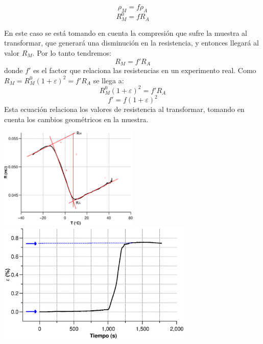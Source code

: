 \documentclass[usenames,dvipsnames]{beamer}
\begin{document}

\begin{frame}
\begin{equation*}
  \rho_M =f \rho_A
\end{equation*}
\begin{equation*}
 R_M^0 =fR_A   
\end{equation*}

En este caso se está tomando en cuenta la compresión que sufre la muestra al transformar, que generará una disminución en la resistencia, y entonces llegará al valor ${R_M}$. Por lo tanto tendremos:
\begin{equation*}
 {R_M}=f'R_A 
\end{equation*}
donde $f'$ es el factor que relaciona las resistencias en un experimento real. Como $R_M=R_M^0 (1+\varepsilon)^2 = f' R_A$ se llega a:
\begin{equation*}
 R_M^0 (1+\varepsilon)^2 = f'R_A
\end{equation*}
\begin{equation*}
f' = f (1+\varepsilon)^2  \label{fprima}
\end{equation*}
Esta ecuación relaciona los valores de resistencia al transformar, tomando en cuenta los cambios geométricos en la muestra. 

\end{frame}



\begin{frame}
        \includegraphics[width=0.5\textwidth]{img/resistencia/ExpRes.eps}
        \includegraphics[width=0.7\textwidth]{img/resistencia/ExpStrain.eps}
\end{frame}
\end{document}
